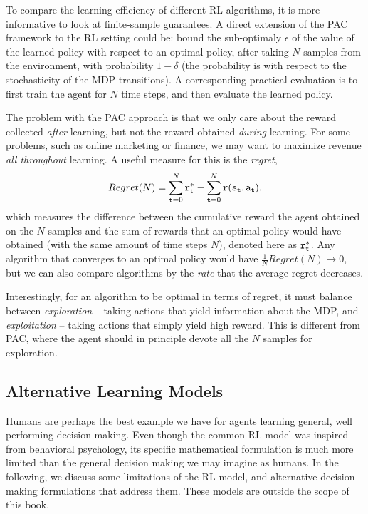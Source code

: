 To compare the learning efficiency of different RL algorithms, it is more informative to look at finite-sample guarantees. A direct extension of the PAC framework to the RL setting could be: bound the sub-optimaly $\epsilon$ of the value of the learned policy with respect to an optimal policy, after taking $N$ samples from the environment, with probability $1 - \delta$ (the probability is with respect to the stochasticity of the MDP transitions). A corresponding practical evaluation is to first train the agent for $N$ time steps, and then evaluate the learned policy. 

The problem with the PAC approach is that we only care about the reward collected \textit{after} learning, but not the reward obtained \textit{during} learning. For some problems, such as online marketing or finance, we may want to maximize revenue \textit{all throughout} learning. A useful measure for this is the \textit{regret}, 
\begin{equation*}
    Regret(N) = \sum_{{\tt t} = 0}^{N} {\tt r}^*_{\tt t} - \sum_{{\tt t} = 0}^{N} {\tt r}({\tt s}_{\tt t},{\tt a}_{\tt t}),
\end{equation*}
which measures the difference between the cumulative reward the agent obtained on the $N$ samples and the sum of rewards that an optimal policy would have obtained (with the same amount of time steps $N$), denoted here as ${\tt r}^*_{\tt t}$. Any algorithm that converges to an optimal policy would have $\frac{1}{N} Regret(N) \to 0$, but we can also compare algorithms by the \textit{rate} that the average regret decreases.

Interestingly, for an algorithm to be optimal in terms of regret, it must balance between \textit{exploration} -- taking actions that yield information about the MDP, and \textit{exploitation} -- taking actions that simply yield high reward. This is different from PAC, where the agent should in principle devote all the $N$ samples for exploration. 



\subsection{Alternative Learning Models}

Humans are perhaps the best example we have for agents learning general, well performing decision making. Even though the common RL model was inspired from behavioral psychology, its specific mathematical formulation is much more limited than the general decision making we may imagine as humans. In the following, we discuss some limitations of the RL model, and alternative decision making formulations that address them. These models are outside the scope of this book.

